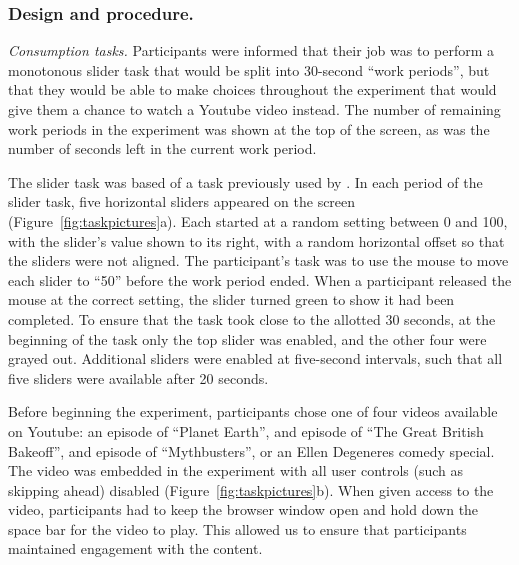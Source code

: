\documentclass[10pt,letterpaper]{article}
\begin{document}
\subsubsection{Design and procedure.}





\emph{Consumption tasks.}
Participants were informed that their job was to perform a monotonous slider task that
would be split into 30-second ``work periods'', but that they would be able to
make choices throughout the experiment that would give them a chance to watch a
Youtube video instead. The number of remaining work periods in the experiment was shown
at the top of the screen, as was the number of seconds left in the current work period.

The slider task was based of a task previously used by \citet{Gill2012}. In each
period of the slider task, five horizontal sliders appeared on the screen (Figure~\ref{fig:taskpictures}a). Each
started at a random setting between 0 and 100, with the slider's value
shown to its right, with a random horizontal offset so that the
sliders were not aligned. The participant's task was to use the mouse to move
each slider to ``50'' before the work period ended. When a participant released
the mouse at the correct setting, the slider turned green to show it had been
completed. To ensure that the task took close to the allotted 30 seconds, at the
beginning of the task only the top slider was enabled, and the other four were
grayed out. Additional sliders were enabled at five-second intervals, such that
all five sliders were available after 20 seconds.

Before beginning the experiment, participants chose one of four videos available
on Youtube: an episode of ``Planet Earth'', and episode of ``The Great British
Bakeoff'', and episode of ``Mythbusters'', or an Ellen Degeneres comedy special.
The video was embedded in the experiment with all user controls (such as
skipping ahead) disabled (Figure~\ref{fig:taskpictures}b). When given access to the video, participants had to keep the
browser window open and hold down the space bar for the video to play. This allowed us to ensure that
participants maintained engagement with the content.
\end{document}
